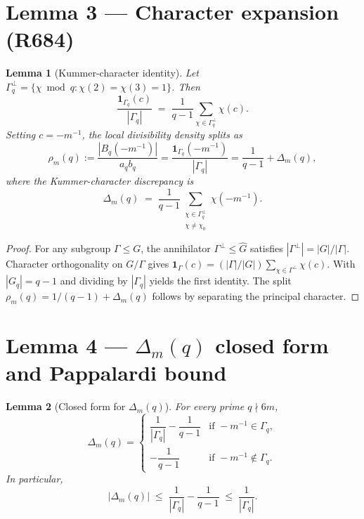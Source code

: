 \documentclass[12pt]{amsart}
\newtheorem{lemma}{Lemma}
\theoremstyle{definition}
\theoremstyle{remark}
\begin{document}
\section{Lemma 3 --- Character expansion (R684)}

\begin{lemma}[Kummer-character identity]\label{lem:R684}
Let $\Gamma_q^\perp = \{\chi \bmod q : \chi(2) = \chi(3) = 1\}$. Then
$$
\frac{\mathbf{1}_{\Gamma_q}(c)}{|\Gamma_q|}
\;=\;
\frac{1}{q - 1}
\sum_{\chi \in \Gamma_q^\perp}
\chi(c).
$$
Setting $c = -m^{-1}$, the local divisibility density splits as
$$
\rho_m(q) := \frac{|B_q(-m^{-1})|}{a_q b_q}
= \frac{\mathbf{1}_{\Gamma_q}(-m^{-1})}{|\Gamma_q|}
= \frac{1}{q-1}
+ \Delta_m(q),
$$
where the Kummer-character discrepancy is
$$
\Delta_m(q)
\;=\;
\frac{1}{q-1}
\sum_{\substack{\chi \in \Gamma_q^\perp \\ \chi \ne \chi_0}}
\chi(-m^{-1}).
$$
\end{lemma}

\begin{proof}
For any subgroup $\Gamma \le G$, the annihilator $\Gamma^\perp \le \widehat{G}$ satisfies
$|\Gamma^\perp| = |G|/|\Gamma|$. Character orthogonality on $G/\Gamma$ gives
$\mathbf{1}_\Gamma(c) = (|\Gamma|/|G|) \sum_{\chi \in \Gamma^\perp} \chi(c)$.
With $|G_q| = q - 1$ and dividing by $|\Gamma_q|$ yields the first identity.
The split $\rho_m(q) = 1/(q-1) + \Delta_m(q)$ follows by separating the principal character.
\end{proof}

\section{Lemma 4 --- $\Delta_m(q)$ closed form and Pappalardi bound}

\begin{lemma}[Closed form for $\Delta_m(q)$]\label{lem:Delta-closed}
For every prime $q \nmid 6m$,
$$
\Delta_m(q)
=
\begin{cases}
\dfrac{1}{|\Gamma_q|} - \dfrac{1}{q-1}
& \text{if } -m^{-1} \in \Gamma_q,
\\[1.2em]
-\dfrac{1}{q-1}
& \text{if } -m^{-1} \notin \Gamma_q.
\end{cases}
$$
In particular,
$$
|\Delta_m(q)|
\;\le\;
\frac{1}{|\Gamma_q|} - \frac{1}{q-1}
\;\le\;
\frac{1}{|\Gamma_q|}.
$$
\end{lemma}
\end{document}

